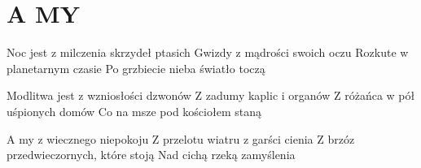 \documentclass[../../../songbook.tex]{subfiles}
\begin{document}
\TabPositions{8cm} %
\section*{A MY}
{}
\vspace{0.5cm}
Noc jest z milczenia skrzydeł ptasich	  \newline
Gwizdy z mądrości swoich oczu	  \newline
Rozkute w planetarnym czasie	  \newline
Po grzbiecie nieba światło toczą	  \newline

Modlitwa jest z wzniosłości dzwonów  \newline
Z zadumy kaplic i organów   \newline
Z różańca w pół uśpionych domów  \newline
Co na msze pod kościołem staną   \newline

\-\hspace{1cm} A my z wiecznego niepokoju		  \newline
\-\hspace{1cm} Z przelotu wiatru z garści cienia  \newline
\-\hspace{1cm} Z brzóz przedwieczornych, które stoją  \newline
\-\hspace{1cm} Nad cichą rzeką zamyślenia  \newline
\end{document}
